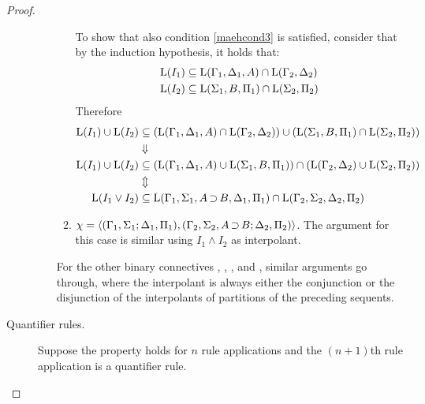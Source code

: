 \begin{proof}
\begin{description}
\begin{itemize}
\begin{enumerate}
							{


								To show that also condition \ref{maehcond3} is satisfied, consider that by the induction hypothesis, it holds that:
								\begin{align*}
									\operatorname{L}(I_1) &\subseteq \operatorname{L}(\Gamma_1, \Delta_1, A) \cap \operatorname{L}(\Gamma_2, \Delta_2) \\
									\operatorname{L}(I_2) &\subseteq \operatorname{L}(\Sigma_1, B, \Pi_1) \cap \operatorname{L}(\Sigma_2, \Pi_2)
								\end{align*}\nopagebreak
								Therefore
								\begin{align*}
									\operatorname{L}(I_1) \cup \operatorname{L}(I_2) &\subseteq
									(\operatorname{L}(\Gamma_1, \Delta_1, A) \cap \operatorname{L}(\Gamma_2, \Delta_2)) \cup ( \operatorname{L}(\Sigma_1, B, \Pi_1) \cap \operatorname{L}(\Sigma_2, \Pi_2))  \\
									&\Downarrow \\
									\operatorname{L}(I_1) \cup \operatorname{L}(I_2) &\subseteq
									(\operatorname{L}(\Gamma_1, \Delta_1, A) \cup \operatorname{L}(\Sigma_1, B, \Pi_1)) \cap (\operatorname{L}(\Gamma_2, \Delta_2) \cup \operatorname{L}(\Sigma_2, \Pi_2)) \\
									&\Updownarrow \\
									\operatorname{L}(I_1 \lor I_2) &\subseteq \operatorname{L}(\Gamma_1, \Sigma_1, A\operatorname{\supset} B, \Delta_1, \Pi_1) \cap \operatorname{L}(\Gamma_2, \Sigma_2, \Delta_2, \Pi_2)
								\end{align*}

							}

						\item $\chi =  \langle (\Gamma_1, \Sigma_1; \Delta_1, \Pi_1), (\Gamma_2, \Sigma_2, A\operatorname{\supset} B; \Delta_2, \Pi_2)\rangle $.
							The argument for this case is similar using $I_1 \land I_2$ as interpolant.
					\end{enumerate}


					For the other binary connectives , , ,  and , similar arguments go through, where the interpolant is always either the conjunction or the disjunction of the interpolants of partitions of the preceding sequents.

			\end{itemize}

		\item[\normalfont Quantifier rules.]
			Suppose the property holds for $n$ rule applications and the $(n+1)$th rule application is a quantifier rule.


\end{description}
\end{proof}
